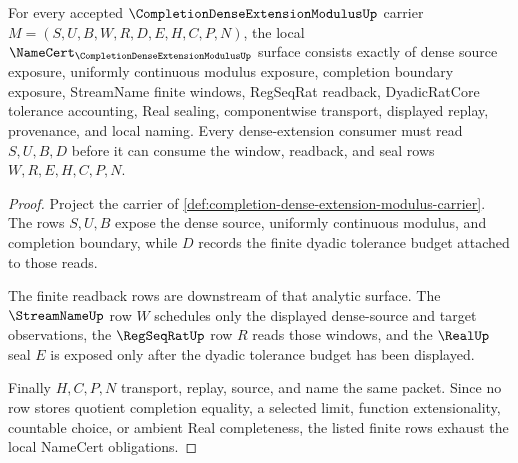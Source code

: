 \begin{theorem}
\label{thm:completion-dense-extension-modulus-namecert-obligations}
For every accepted $\CompletionDenseExtensionModulusUp$ carrier $M=(S,U,B,W,R,D,E,H,C,P,N)$, the local $\NameCert_{\CompletionDenseExtensionModulusUp}$ surface consists exactly of dense source exposure, uniformly continuous modulus exposure, completion boundary exposure, StreamName finite windows, RegSeqRat readback, DyadicRatCore tolerance accounting, Real sealing, componentwise transport, displayed replay, provenance, and local naming. Every dense-extension consumer must read $S,U,B,D$ before it can consume the window, readback, and seal rows $W,R,E,H,C,P,N$.
\end{theorem}
\begin{proof}
Project the carrier of \autoref{def:completion-dense-extension-modulus-carrier}. The rows $S,U,B$ expose the dense source, uniformly continuous modulus, and completion boundary, while $D$ records the finite dyadic tolerance budget attached to those reads.

The finite readback rows are downstream of that analytic surface. The $\StreamNameUp$ row $W$ schedules only the displayed dense-source and target observations, the $\RegSeqRatUp$ row $R$ reads those windows, and the $\RealUp$ seal $E$ is exposed only after the dyadic tolerance budget has been displayed.

Finally $H,C,P,N$ transport, replay, source, and name the same packet. Since no row stores quotient completion equality, a selected limit, function extensionality, countable choice, or ambient Real completeness, the listed finite rows exhaust the local NameCert obligations.
\end{proof}

